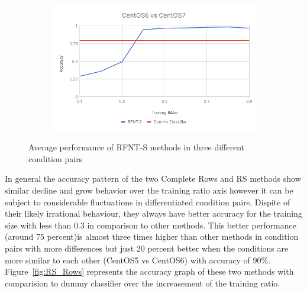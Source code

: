 \documentclass[10pt, conference, compsocconf]{IEEEtran}
\begin{document}
\begin{figure}[h!]
\begin{subfigure}[b]{0.8\linewidth}
                \includegraphics[width=\columnwidth]{figures/ALS/RFNT-S-ALS-6vs7-PFS}
        \end{subfigure}
        \caption{Average performance of RFNT-S methods in three different condition pairs}
        \label{fig:RFNT-S method}
\end{figure}
In general the accuracy pattern of the two Complete Rows and 
RS methods show similar decline and grow behavior over the 
training ratio axis however it can be subject to considerable 
fluctuations in differentiated condition pairs. Dispite of their 
likely irrational behaviour, they always have better accuracy 
for the training size with less than $0.3$ in comparison to other 
methods. This better performance (around 75 percent)is almost three 
times higher than other methods in condition pairs with more 
differences but just 20 percent better when the conditions are more 
similar to each other (CentOS5 vs CentOS6) with accuracy of $90\%$.
Figure~\ref{fig:RS_Rows} represents
the accuracy graph of these two methods with comparision to dummy
classifier over the increasement of the training ratio.
\end{document}

